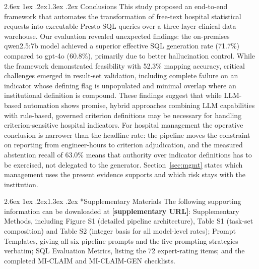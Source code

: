 \documentclass[10pt]{article}
\makeatletter
\renewcommand\section{\@startsection{section}{1}{\z@}%
  {2.6ex \@plus 1ex \@minus .2ex}{1.3ex \@plus .2ex}%
  {\normalfont\large\bfseries}}
\newcommand{\PH}[1]{{\color{red}\textbf{[#1]}}}
\makeatother
\begin{document}
\section{Conclusions}
This study proposed an end-to-end framework that automates the transformation of
free-text hospital statistical requests into executable Presto SQL queries over
a three-layer clinical data warehouse. Our evaluation revealed unexpected
findings: the on-premises qwen2.5:7b model achieved a superior effective SQL
generation rate (71.7\%) compared to gpt-4o (60.8\%), primarily due to better
hallucination control. While the framework demonstrated feasibility with 52.3\%
mapping accuracy, critical challenges emerged in result-set validation,
including complete failure on an indicator whose defining flag is unpopulated
and minimal overlap where an institutional definition is compound. These
findings suggest that while LLM-based automation shows promise, hybrid
approaches combining LLM capabilities with rule-based, governed criterion
definitions may be necessary for handling criterion-sensitive hospital
indicators. For hospital management the operative conclusion is narrower than the
headline rate: the pipeline moves the constraint on reporting from engineer-hours
to criterion adjudication, and the measured abstention recall of 63.0\% means that
authority over indicator definitions has to be exercised, not delegated to the
generator. Section~\ref{sec:mgmt} states which management uses the present
evidence supports and which risk stays with the institution.

\section*{Supplementary Materials}
The following supporting information can be downloaded at
\PH{supplementary URL}: Supplementary Methods, including Figure S1 (detailed
pipeline architecture), Table S1 (task-set composition) and Table S2 (integer
basis for all model-level rates); Prompt Templates, giving all six pipeline
prompts and the five prompting strategies verbatim; SQL Evaluation Metrics,
listing the 72 expert-rating items; and the completed MI-CLAIM and MI-CLAIM-GEN
checklists.
\end{document}
